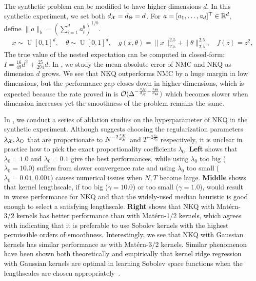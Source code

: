 The synthetic problem can be modified to have higher dimensions $d$. In this synthetic experiment, we set both $d_{\mathcal{X}} = d_\Theta =d$.
For $a = [a_1 ,\ldots, a_d]^\top \in \mathbb{R}^{d}$, define $\|a\|_{b} = ( \sum_{i=1}^{d} a_i^b)^{1/b}$.
\begin{align}\label{eq:toy_high_d}
    & x \sim \operatorname{U}[0,1]^{d}, \quad \theta \sim \operatorname{U}[0,1]^{d}, \quad g(x, \theta) = \|x\|_{2.5}^{2.5} +  \| \theta \|_{2.5}^{2.5}, \quad f( z) = z^2,
\end{align}
The true value of the nested expectation can be computed in closed-form: $I = \frac{16}{49}d^2 + \frac{25}{294} d$. In , we study the mean absolute error of NMC and NKQ as dimension $d$ grows. 
We see that NKQ outperforms NMC by a huge margin in low dimensions, but the performance gap closes down in higher dimensions, which is expected because the rate proved in  is $\mathcal{O}(\Delta^{- \frac{ s_{\mathcal{X}}}{d_{\mathcal{X}}} - \frac{ s_\Theta}{d_\Theta}})$ which becomes slower when dimension increases yet the smoothness of the problem remains the same.

In , we conduct a series of ablation studies on the hyperparameter of NKQ in the synthetic experiment. 
Although  suggests choosing the regularization parameters $\lambda_{\mathcal{X}}, \lambda_\Theta $ that are proportionate to $N^{-2\frac{s_{\mathcal{X}}}{d_{\mathcal{X}}}}$ and $T^{-2\frac{s_\Theta}{d_\Theta}}$ respectively, it is unclear in practice how to pick the exact proportionality coefficients $\lambda_0$. 
 \textbf{Left} shows that $\lambda_0 = 1.0$ and $\lambda_0 = 0.1$ give the best performances, while using $\lambda_0$ too big ($\lambda_0 = 10.0$) suffers from slower convergence rate and using $\lambda_0$ too small ($\lambda_0 = 0.01, 0.001$) causes numerical issues when $N, T$ become large.
 \textbf{Middle} shows that kernel lengthscale, if too big ($\gamma=10.0$) or too small ($\gamma=1.0$), would result in worse performance for NKQ and that the widely-used median heuristic is good enough to select a satisfying lengthscale. 
 \textbf{Right} shows that NKQ with Matérn-3/2 kernels has better performance than with Matérn-1/2 kernels, which agrees with  indicating that it is preferable to use Sobolev kernels with the highest permissible orders of smoothness.
Interestingly, we see that NKQ with Gaussian kernels has similar performance as with Matérn-3/2 kernels. 
Similar phenomenon have been shown both theoretically and empirically that kernel ridge regression with Gaussian kernels are optimal in learning Sobolev space functions when the lengthscales are chosen appropriately~\citep{hang2021optimal, eberts2013optimal}.


